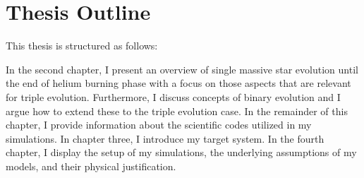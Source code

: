 \section{Thesis Outline}
This thesis is structured as follows: 

In the second chapter, I present an overview of single massive star evolution until the end of helium burning phase with a focus on those aspects that are relevant for triple evolution. Furthermore, I discuss concepts of binary evolution and I argue how to extend these to the triple evolution case. In the remainder of this chapter, I provide information about the scientific codes utilized in my simulations. In chapter three, I introduce my target system. In the fourth chapter, I display the setup of my simulations, the underlying assumptions of my models, and their physical justification.



